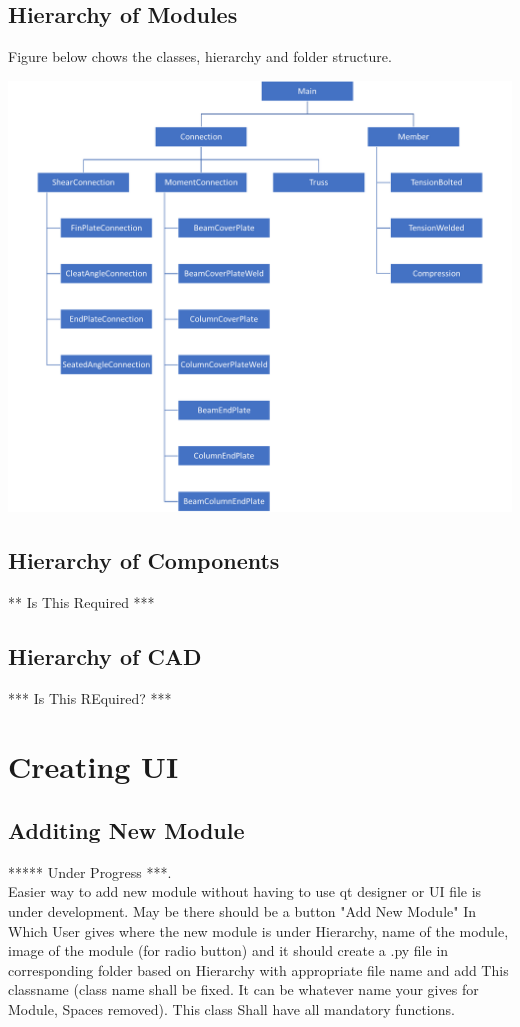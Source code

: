 \documentclass[11pt,a4paper]{report}
\begin{document}
\section{Hierarchy of Modules}
\noindent Figure below chows the classes, hierarchy and folder structure.
\begin{center}
	\includegraphics [width=15cm]{Class_Hierarchy.png}
\end{center}

\section{Hierarchy of Components}
\noindent *** Is This Required ***

\section{Hierarchy of CAD}
\noindent **** Is This REquired? ***

\chapter{\textbf{Creating UI}}
\section{Additing New Module}
\noindent ****** Under Progress ***.\\
\noindent Easier way to add new module without having to use qt designer or UI file is under development. May be there should be a button "Add New Module" In Which User gives where the new module is under Hierarchy, name of the module, image of the module (for radio button) and it should create a .py file in corresponding folder based on Hierarchy with appropriate file name and add This classname (class name shall be fixed. It can be whatever name your gives for Module, Spaces removed). This class Shall have all mandatory functions.
\end{document}
